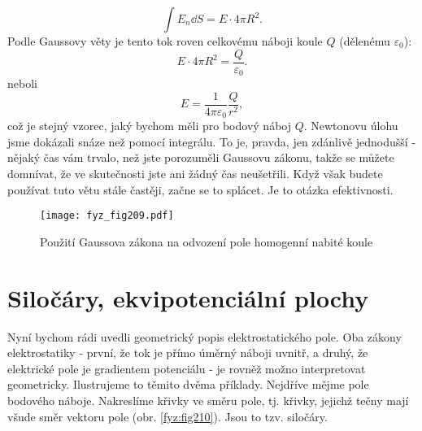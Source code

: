 {    \begin{equation*}
      \int E_n\dd{S} = E\cdot4\pi R^2.
    \end{equation*} 
    Podle Gaussovy věty je tento tok roven celkovému náboji koule \(Q\) (dělenému 
    \(\varepsilon_0\)):
    \begin{equation*}
      E\cdot4\pi R^2 = \frac{Q}{\varepsilon_0}.
    \end{equation*} 
    neboli
    \begin{equation*}
      E  = \frac{1}{4\pi\varepsilon_0}\frac{Q}{r^2},
    \end{equation*}
    \noindent což je stejný vzorec, jaký bychom měli pro bodový náboj \(Q\). Newtonovu úlohu jsme 
    dokázali snáze než pomocí integrálu. To je, pravda, jen zdánlivě jednodušší - nějaký čas vám 
    trvalo, než jste porozuměli Gaussovu zákonu, takže se můžete domnívat, že ve skutečnosti jste 
    ani žádný čas neušetřili. Když však budete používat tuto větu stále častěji, začne se to 
    splácet. Je to otázka efektivnosti.    
    \begin{figure}[ht!]
      \centering
      \texttt{[image: fyz\_fig209.pdf]}
      \caption{Použití Gaussova zákona na odvození pole homogenní nabité koule}
      \label{fyz:fig209}  
    \end{figure}
   

  \section{Siločáry, ekvipotenciální plochy}\label{fyz:IIchapIVsecVIII}
    \cite[s.~78]{Feynman02} Nyní bychom rádi uvedli geometrický popis elektrostatického pole. Oba 
    zákony elektrostatiky - první, že tok je přímo úměrný náboji uvnitř, a druhý, že elektrické 
    pole je gradientem potenciálu - je rovněž možno interpretovat geometricky. Ilustrujeme to 
    těmito dvěma příklady. Nejdříve mějme pole bodového náboje. Nakreslíme křivky ve směru pole, 
    tj. křivky, jejichž tečny mají všude směr vektoru pole (obr. \ref{fyz:fig210}). Jsou 
    to tzv. siločáry.
    
}
